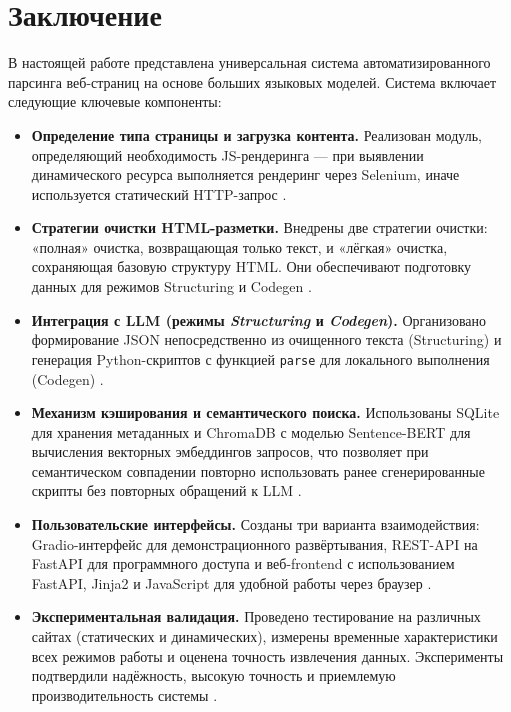 
\section{Заключение}

В настоящей работе представлена универсальная система автоматизированного парсинга веб-страниц на основе больших языковых моделей. Система включает следующие ключевые компоненты:

\begin{itemize}
    \item \textbf{Определение типа страницы и загрузка контента.} Реализован модуль, определяющий необходимость JS-рендеринга — при выявлении динамического ресурса выполняется рендеринг через Selenium, иначе используется статический HTTP-запрос \cite{RequestsDocumentation, SeleniumDocumentation}.
    \item \textbf{Стратегии очистки HTML-разметки.} Внедрены две стратегии очистки: «полная» очистка, возвращающая только текст, и «лёгкая» очистка, сохраняющая базовую структуру HTML. Они обеспечивают подготовку данных для режимов Structuring и Codegen \cite{Brown2020}.
    \item \textbf{Интеграция с LLM (режимы \emph{Structuring} и \emph{Codegen}).} Организовано формирование JSON непосредственно из очищенного текста (Structuring) и генерация Python-скриптов с функцией \lstinline|parse| для локального выполнения (Codegen) \cite{Dong2022CacheLLM, Kalyan2023}.
    \item \textbf{Механизм кэширования и семантического поиска.} Использованы SQLite для хранения метаданных и ChromaDB с моделью Sentence-BERT для вычисления векторных эмбеддингов запросов, что позволяет при семантическом совпадении повторно использовать ранее сгенерированные скрипты без повторных обращений к LLM \cite{Reimers2019, ChromaDBDocumentation}.
    \item \textbf{Пользовательские интерфейсы.} Созданы три варианта взаимодействия: Gradio-интерфейс для демонстрационного развёртывания, REST-API на FastAPI для программного доступа и веб-frontend с использованием FastAPI, Jinja2 и JavaScript для удобной работы через браузер \cite{FastAPIDocumentation, GradioDocumentation, Jinja2Documentation}.
    \item \textbf{Экспериментальная валидация.} Проведено тестирование на различных сайтах (статических и динамических), измерены временные характеристики всех режимов работы и оценена точность извлечения данных. Эксперименты подтвердили надёжность, высокую точность и приемлемую производительность системы \cite{Dong2022CacheLLM}.
\end{itemize}

